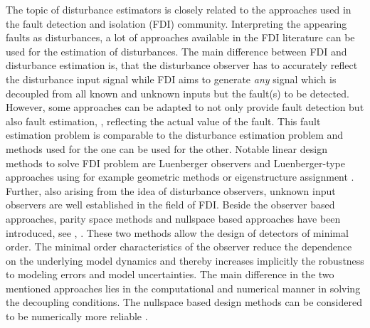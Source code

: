 \documentclass[graybox]{svmult}
\begin{document}
The topic of disturbance estimators is closely related to the approaches used in the fault detection and isolation (FDI) community. Interpreting the appearing faults as disturbances, a lot of approaches available in the FDI literature can be used for the estimation of disturbances. The main difference between FDI and disturbance estimation is, that the disturbance observer has to accurately reflect the disturbance input signal while FDI aims to generate \textit{any} signal which is decoupled from all known and unknown inputs but the fault(s) to be detected. However, some approaches can be adapted to not only provide fault detection but also fault estimation, \ie, reflecting the actual value of the fault. This fault estimation problem is comparable to the disturbance estimation problem and methods used for the one can be used for the other. Notable linear design methods to solve  FDI problem are Luenberger observers \cite{Jones71} and Luenberger-type approaches using for example geometric methods \cite{Massoumnia86} or eigenstructure assignment \cite{Chen99}.
Further, also arising from the idea of disturbance observers, unknown input observers \cite{Chen99} are well established in the field of FDI.
Beside the observer based approaches, parity space  methods \cite{Chow84, Lou86} and nullspace based approaches have been introduced, see \eg, \cite{frisk_01,varga07}. These two methods allow the design of detectors of minimal order. The minimal order characteristics of the observer reduce the dependence on the underlying model dynamics and thereby increases implicitly the robustness to modeling errors and model uncertainties.
The main difference in the two mentioned approaches lies in the computational and numerical manner in solving the decoupling conditions. The nullspace based design methods can be considered to be numerically more reliable \cite{Var09}. 
\end{document}
